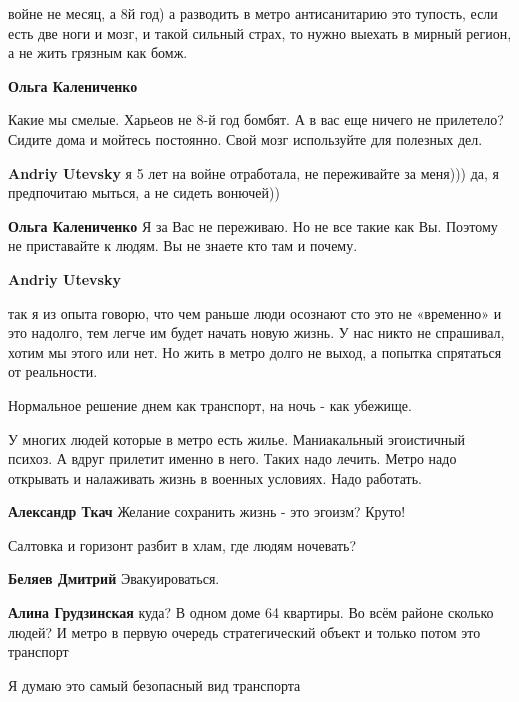 \begin{itemize}
\begin{itemize}
войне не месяц, а 8й год) а разводить в метро антисанитарию это тупость, если
есть две ноги и мозг, и такой сильный страх, то нужно выехать в мирный регион,
а не жить грязным как бомж.

\textbf{Ольга Калениченко} 

Какие мы смелые. Харьеов не 8-й год бомбят. А в вас еще ничего не прилетело?
Сидите дома и мойтесь постоянно. Свой мозг используйте для полезных дел.


\textbf{Andriy Utevsky} я 5 лет на войне отработала, не переживайте за меня))) да, я предпочитаю мыться, а не сидеть вонючей))

\textbf{Ольга Калениченко} Я за Вас не переживаю. Но не все такие как Вы. Поэтому не приставайте к людям. Вы не знаете кто там и почему.

\textbf{Andriy Utevsky} 

так я из опыта говорю, что чем раньше люди осознают сто это не «временно» и это
надолго, тем легче им будет начать новую жизнь. У нас никто не спрашивал, хотим
мы этого или нет. Но жить в метро долго не выход, а попытка спрятаться от
реальности.

\end{itemize} %


Нормальное решение днем как транспорт, на ночь - как убежище.


У многих людей которые в метро есть жилье. Маниакальный эгоистичный психоз. А
вдруг прилетит именно в него. Таких надо лечить. Метро надо открывать и
налаживать жизнь в военных условиях. Надо работать.

\textbf{Александр Ткач} Желание сохранить жизнь - это эгоизм? Круто!

Салтовка и горизонт разбит в хлам, где людям ночевать?

\begin{itemize} %
\textbf{Беляев Дмитрий} Эвакуироваться.

\textbf{Алина Грудзинская} куда? В одном доме 64 квартиры. Во всём районе сколько людей? И метро в первую очередь стратегический объект и только потом это транспорт
\end{itemize} %

Я думаю это самый безопасный вид транспорта


\end{itemize}
